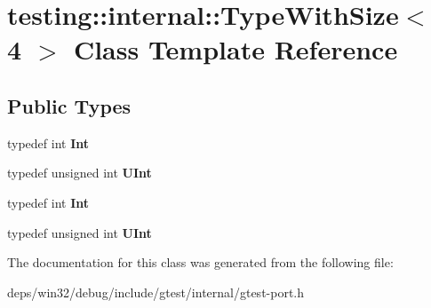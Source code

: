 \hypertarget{classtesting_1_1internal_1_1_type_with_size_3_014_01_4}{}\section{testing\+:\+:internal\+:\+:Type\+With\+Size$<$ 4 $>$ Class Template Reference}
\label{classtesting_1_1internal_1_1_type_with_size_3_014_01_4}
\subsection*{Public Types}
\begin{DoxyCompactItemize}
\item 
\hypertarget{classtesting_1_1internal_1_1_type_with_size_3_014_01_4_a80351860c00ed665e73f952143f4484a}{}typedef int {\bfseries Int}\label{classtesting_1_1internal_1_1_type_with_size_3_014_01_4_a80351860c00ed665e73f952143f4484a}

\item 
\hypertarget{classtesting_1_1internal_1_1_type_with_size_3_014_01_4_a7d559570f830bf35d095eeb94d98de58}{}typedef unsigned int {\bfseries U\+Int}\label{classtesting_1_1internal_1_1_type_with_size_3_014_01_4_a7d559570f830bf35d095eeb94d98de58}

\item 
\hypertarget{classtesting_1_1internal_1_1_type_with_size_3_014_01_4_a80351860c00ed665e73f952143f4484a}{}typedef int {\bfseries Int}\label{classtesting_1_1internal_1_1_type_with_size_3_014_01_4_a80351860c00ed665e73f952143f4484a}

\item 
\hypertarget{classtesting_1_1internal_1_1_type_with_size_3_014_01_4_a7d559570f830bf35d095eeb94d98de58}{}typedef unsigned int {\bfseries U\+Int}\label{classtesting_1_1internal_1_1_type_with_size_3_014_01_4_a7d559570f830bf35d095eeb94d98de58}

\end{DoxyCompactItemize}


The documentation for this class was generated from the following file\+:\begin{DoxyCompactItemize}
\item 
deps/win32/debug/include/gtest/internal/gtest-\/port.\+h\end{DoxyCompactItemize}
